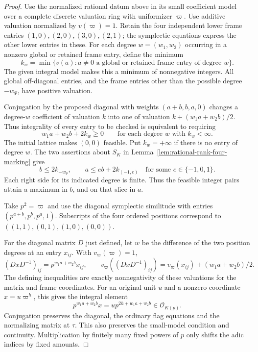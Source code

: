 \begin{proof}
Use the normalized rational datum above in its small
coefficient model over a complete
discrete valuation ring with uniformizer \(\varpi\).
Use additive valuation normalized by
\(v(\varpi)=1\). Retain the four independent lower frame entries
\((1,0),(2,0),(3,0),(2,1)\); the symplectic equations
express the other lower entries in these. For each degree \(w=(w_1,w_2)\) occurring in a nonzero global or retained frame entry, define the minimum
\[
 k_w=\min\{v(a):a\ne0\text{ a global or retained frame entry of degree }w\}.
\] The given integral model makes
this a minimum of nonnegative integers. All global
off-diagonal entries, and the frame entries other than the
possible degree \(-w_\Psi\), have positive valuation.

Conjugation by the proposed diagonal with weights
\((a+b,b,a,0)\) changes a degree-\(w\) coefficient of
valuation \(k\) into one of valuation \(k+(w_1a+w_2b)/2\).
Thus integrality of every entry to be checked is equivalent
to requiring
\[
             w_1a+w_2b+2k_w\ge0
                    \qquad\text{for each degree }w\text{ with }k_w<\infty .
\]
The initial lattice makes \((0,0)\) feasible. Put \(k_w=+\infty\)
if there is no entry of degree \(w\). The two assertions about
\(S_K\) in Lemma~\ref{lem:rational-rank-four-marking} give
\[
 b\le 2k_{-w_\Psi},\qquad
 a\le e b+2k_{(-1,e)}\quad\text{for some }e\in\{-1,0,1\}.
\]
Each right side for its indicated degree is finite. Thus the feasible
integer pairs attain a maximum in \(b\), and on that slice in \(a\).

Take \(p^2=\varpi\) and use
the diagonal symplectic similitude with entries
\((p^{a+b},p^b,p^a,1)\). Subscripts of the
four ordered positions correspond to
\(((1,1),(0,1),(1,0),(0,0))\).

For the diagonal matrix \(D\) just defined, let \(w\) be the difference
of the two position degrees at an entry \(x_{ij}\). With \(v_\varpi(\varpi)=1\),
\[
 (DxD^{-1})_{ij}=p^{w_1a+w_2b}x_{ij},\qquad
 v_\varpi((DxD^{-1})_{ij})=v_\varpi(x_{ij})+(w_1a+w_2b)/2.
\]
The defining inequalities are exactly nonnegativity of these valuations
for the matrix and frame coordinates. For an original unit \(u\) and
a nonzero coordinate \(x=u\varpi^h\), this gives the integral element
\[
           p^{w_1a+w_2b}x=u p^{2h+w_1a+w_2b}
                     \in\mathcal O_{K(p)}.
\] Conjugation
preserves the diagonal, the ordinary flag equations
and the normalizing matrix at \(\tau\). This also
preserves the small-model condition and continuity.
Multiplication by finitely many fixed powers of \(p\)
only shifts the adic indices by fixed amounts.


\end{proof}
